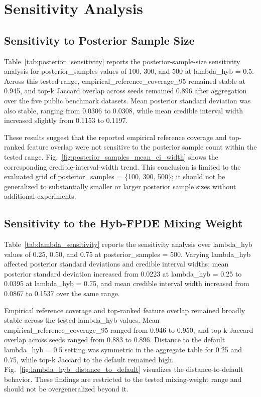\section{Sensitivity Analysis}

\subsection{Sensitivity to Posterior Sample Size}

Table~\ref{tab:posterior_sensitivity} reports the posterior-sample-size sensitivity analysis for posterior\_samples values of 100, 300, and 500 at lambda\_hyb = 0.5. Across this tested range, empirical\_reference\_coverage\_95 remained stable at 0.945, and top-k Jaccard overlap across seeds remained 0.896 after aggregation over the five public benchmark datasets. Mean posterior standard deviation was also stable, ranging from 0.0306 to 0.0308, while mean credible interval width increased slightly from 0.1153 to 0.1197.

These results suggest that the reported empirical reference coverage and top-ranked feature overlap were not sensitive to the posterior sample count within the tested range. Fig.~\ref{fig:posterior_samples_mean_ci_width} shows the corresponding credible-interval-width trend. This conclusion is limited to the evaluated grid of posterior\_samples = \{100, 300, 500\}; it should not be generalized to substantially smaller or larger posterior sample sizes without additional experiments.

\subsection{Sensitivity to the Hyb-FPDE Mixing Weight}

Table~\ref{tab:lambda_sensitivity} reports the sensitivity analysis over lambda\_hyb values of 0.25, 0.50, and 0.75 at posterior\_samples = 500. Varying lambda\_hyb affected posterior standard deviations and credible interval widths: mean posterior standard deviation increased from 0.0223 at lambda\_hyb = 0.25 to 0.0395 at lambda\_hyb = 0.75, and mean credible interval width increased from 0.0867 to 0.1537 over the same range.

Empirical reference coverage and top-ranked feature overlap remained broadly stable across the tested lambda\_hyb values. Mean empirical\_reference\_coverage\_95 ranged from 0.946 to 0.950, and top-k Jaccard overlap across seeds ranged from 0.883 to 0.896. Distance to the default lambda\_hyb = 0.5 setting was symmetric in the aggregate table for 0.25 and 0.75, while top-k Jaccard to the default remained high. Fig.~\ref{fig:lambda_hyb_distance_to_default} visualizes the distance-to-default behavior. These findings are restricted to the tested mixing-weight range and should not be overgeneralized beyond it.
